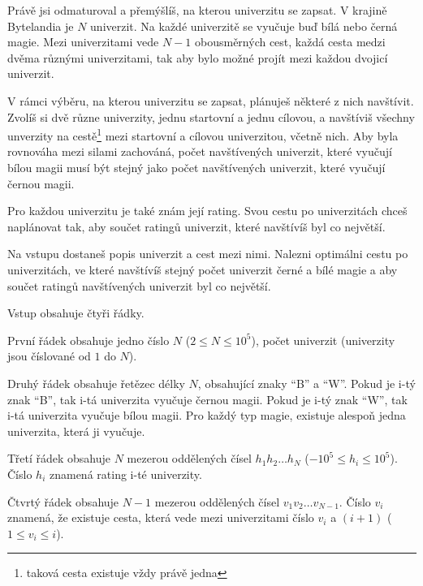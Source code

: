





Právě jsi odmaturoval a přemýšlíš, na kterou univerzitu se zapsat.
V krajině Bytelandia je $N$ univerzit.
Na každé univerzitě se vyučuje buď bílá nebo černá magie.
Mezi univerzitami vede $N-1$ obousměrných cest, každá cesta medzi dvěma různými univerzitami,
tak aby bylo možné projít mezi každou dvojicí univerzit.

V rámci výběru, na kterou univerzitu se zapsat, plánuješ některé z nich navštívit.
Zvolíš si dvě různe univerzity, jednu startovní a jednu cílovou, a navštíviš
všechny unverzity na cestě\footnote{taková cesta existuje vždy právě jedna} mezi
startovní a cílovou univerzitou, včetně nich.
Aby byla rovnováha mezi silami zachováná, počet navštívených univerzit, které
vyučují bílou magii musí být stejný jako počet navštívených univerzit, které
vyučují černou magii.

Pro každou univerzitu je také znám její rating. Svou cestu po univerzitách chceš
naplánovat tak, aby součet ratingů univerzit, které navštívíš byl co největší.


Na vstupu dostaneš popis univerzit a cest mezi nimi.
Nalezni optimálni cestu po univerzitách, ve které navštívíš stejný počet
univerzit černé a bílé magie a aby součet ratingů navštívených univerzit
byl co největší.


Vstup obsahuje čtyři řádky.

První řádek obsahuje jedno číslo $N$ ($2 \leq N \leq 10^5$), počet univerzit (univerzity jsou číslované od $1$ do $N$).

Druhý řádek obsahuje řetězec délky $N$, obsahující znaky ``B'' a ``W''.
Pokud je i-tý znak ``B'', tak i-tá univerzita vyučuje černou magii.
Pokud je i-tý znak ``W'', tak i-tá univerzita vyučuje bílou magii.
Pro každý typ magie, existuje alespoň jedna univerzita, která ji vyučuje.

Třetí řádek obsahuje $N$ mezerou oddělených čísel $h_1 h_2 \ldots h_N$ ($-10^5 \leq h_i \leq 10^5$).
Číslo $h_i$ znamená rating i-té univerzity.

Čtvrtý řádek obsahuje $N-1$ mezerou oddělených čísel $v_1 v_2 \ldots v_{N-1}$.
Číslo $v_i$ znamená, že existuje cesta, která vede mezi univerzitami číslo $v_i$ a $(i+1)$ ($1 \leq v_i \leq i$).


